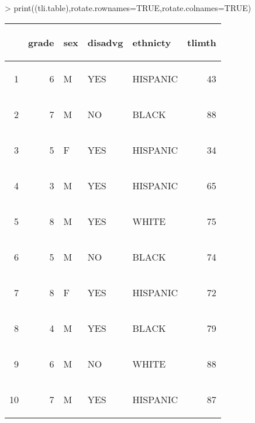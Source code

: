 \documentclass[letterpaper]{article}
\begin{document}
\begin{Schunk}
\begin{Sinput}
> print((tli.table),rotate.rownames=TRUE,rotate.colnames=TRUE)
\end{Sinput}
% latex table generated in R 3.1.1 by xtable 1.7-3 package
% 
\begin{table}[ht]
\centering
\begin{tabular}{|rr|lp{3cm}l|r|}
  \hline
 & \begin{sideways} grade \end{sideways} & \begin{sideways} sex \end{sideways} & \begin{sideways} disadvg \end{sideways} & \begin{sideways} ethnicty \end{sideways} & \begin{sideways} tlimth \end{sideways} \\ 
  \hline
\begin{sideways} 1 \end{sideways} & 6 & M & YES & HISPANIC & 43 \\ 
  \begin{sideways} 2 \end{sideways} &  7 & M & NO & BLACK & 88 \\ 
  \begin{sideways} 3 \end{sideways} &   5 & F & YES & HISPANIC &  34 \\ 
  \begin{sideways} 4 \end{sideways} &    3 & M & YES & HISPANIC &   65 \\ 
  \begin{sideways} 5 \end{sideways} &     8 & M & YES & WHITE &    75 \\ 
  \begin{sideways} 6 \end{sideways} & 5 & M & NO & BLACK & 74 \\ 
  \begin{sideways} 7 \end{sideways} &  8 & F & YES & HISPANIC & 72 \\ 
  \begin{sideways} 8 \end{sideways} &   4 & M & YES & BLACK &  79 \\ 
  \begin{sideways} 9 \end{sideways} &    6 & M & NO & WHITE &   88 \\ 
  \begin{sideways} 10 \end{sideways} &     7 & M & YES & HISPANIC &    87 \\ 
   \hline
\end{tabular}
\end{table}\end{Schunk}
\end{document}

